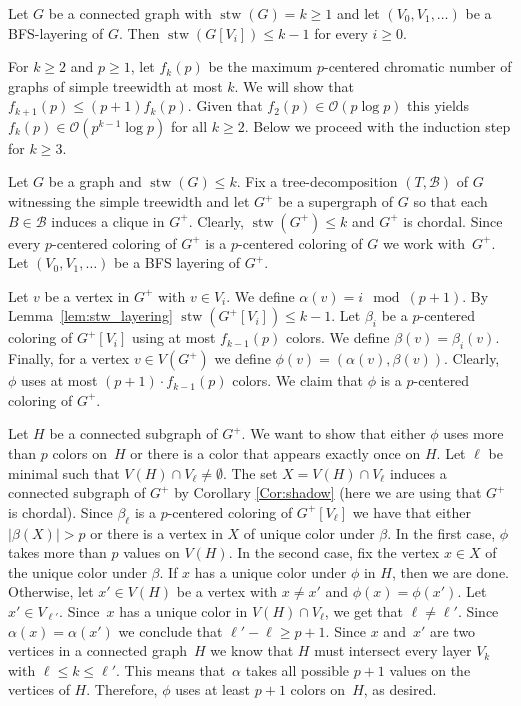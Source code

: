 \begin{lemma}
\label{lem:stw_layering}
Let $G$ be a connected graph with $\operatorname{stw}(G)=k \geq 1$ and let
$(V_0,V_1,\ldots)$ be a BFS-layering of $G$.  Then $\operatorname{stw}(G[V_i]) \leq k-1$ for
every $i\geq0$.
\end{lemma}

For $k\geq2$ and $p\geq1$, 
let $f_k(p)$ be the maximum $p$-centered chromatic number of graphs of simple treewidth at most $k$.
We will show that $f_{k+1}(p)\leq (p+1) f_k(p)$.
Given that $f_2(p)\in\mathcal{O}(p \log p)$ this yields $f_k(p)\in\mathcal{O}(p^{k-1}\log p)$ for all $k\geq2$.
Below we proceed with the induction step for $k\geq3$.

Let $G$ be a graph and $\operatorname{stw}(G)\leq k$.  Fix a tree-decomposition $(T,\mathcal{B})$
of $G$ witnessing the simple treewidth and let $G^+$ be a supergraph of $G$ so
that each $B\in\mathcal{B}$ induces a clique in $G^+$.  Clearly, $\operatorname{stw}(G^+)\leq k$
and $G^+$ is chordal.  Since every $p$-centered coloring of $G^+$ is a
$p$-centered coloring of $G$ we work with~$G^+$.
Let $(V_0,V_1,\ldots)$ be a BFS layering of $G^+$.

Let $v$ be a vertex in $G^+$ with $v\in V_i$. We define $\alpha(v)=i\!\!\mod (p+1)$.
By Lemma~\ref{lem:stw_layering} $\operatorname{stw}(G^+[V_i])\leq k-1$.
Let $\beta_i$ be a $p$-centered coloring of $G^+[V_i]$ 
using at most $f_{k-1}(p)$ colors.
We define $\beta(v)=\beta_i(v)$.
Finally, for a vertex $v\in V(G^+)$ we define $\phi(v)=(\alpha(v),\beta(v))$. 
Clearly, $\phi$ uses at most $(p+1)\cdot f_{k-1}(p)$ colors.
We claim that $\phi$ is a $p$-centered coloring of $G^+$.

Let $H$ be a connected subgraph of $G^+$.
We want to show that either $\phi$ uses more than $p$ colors on~$H$ or
there is a color that appears exactly once on $H$.
Let $\ell$ be minimal such that $V(H)\cap V_{\ell}\neq\emptyset$.
The set $X=V(H)\cap V_{\ell}$ induces a connected subgraph of $G^+$ by
Corollary \ref{Cor:shadow} (here we are using that $G^+$ is chordal).
Since $\beta_{\ell}$ is a $p$-centered coloring of $G^+[V_{\ell}]$ we have that
either $|\beta(X)|>p$
or there is a vertex in $X$ 
of unique color under $\beta$.
In the first case, $\phi$ takes more than $p$ values on $V(H)$.
In the second case, fix the vertex $x\in X$ of the unique color under $\beta$.
If $x$ has a unique color under $\phi$ in $H$, then we are done.
Otherwise, let $x'\in V(H)$ be a vertex with $x\neq x'$ and $\phi(x)=\phi(x')$.
Let $x'\in V_{\ell'}$.
Since~$x$ has a unique color in $V(H)\cap V_{\ell}$, we get that $\ell\neq\ell'$.
Since $\alpha(x)=\alpha(x')$ we conclude that $\ell'-\ell\geq p+1$.
Since $x$ and~$x'$ are two vertices in a connected graph~$H$ 
we know that $H$ must intersect every layer $V_k$ with $\ell\leq k \leq \ell'$.
This means that~$\alpha$ takes all possible $p+1$ values on the vertices of $H$.
Therefore, $\phi$ uses at least $p+1$ colors on~$H$, as desired.

